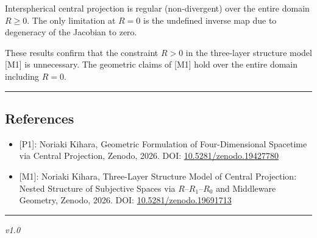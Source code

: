 \documentclass[
  a4paper]{article}
\providecommand{\tightlist}{%
  \setlength{\itemsep}{0pt}\setlength{\parskip}{0pt}}
\begin{document}
Interspherical central projection is regular (non-divergent) over the
entire domain \(R \geq 0\). The only limitation at \(R = 0\) is the
undefined inverse map due to degeneracy of the Jacobian to zero.

These results confirm that the constraint \(R > 0\) in the three-layer
structure model {[}M1{]} is unnecessary. The geometric claims of
{[}M1{]} hold over the entire domain including \(R = 0\).

\begin{center}\rule{0.5\linewidth}{0.5pt}\end{center}

\subsection{References}\label{references}

\begin{itemize}
\tightlist
\item
  {[}P1{]}: Noriaki Kihara, Geometric Formulation of Four-Dimensional
  Spacetime via Central Projection, Zenodo, 2026. DOI:
  \href{https://doi.org/10.5281/zenodo.19427780}{10.5281/zenodo.19427780}
\item
  {[}M1{]}: Noriaki Kihara, Three-Layer Structure Model of Central
  Projection: Nested Structure of Subjective Spaces via
  \(R\)--\(R_1\)--\(R_0\) and Middleware Geometry, Zenodo, 2026. DOI:
  \href{https://doi.org/10.5281/zenodo.19691713}{10.5281/zenodo.19691713}
\end{itemize}

\begin{center}\rule{0.5\linewidth}{0.5pt}\end{center}

\emph{v1.0}
\end{document}
